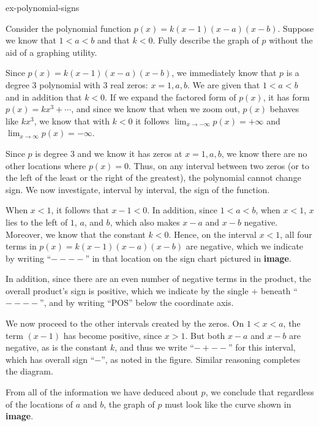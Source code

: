 \documentclass{ximera}
\begin{document}
\begin{example}{}{ex-polynomial-signs}%

Consider the polynomial function $p(x) = k(x-1)(x-a)(x-b)$.  Suppose we know that $1 < a < b$ and that $k < 0$.  Fully describe the graph of $p$ without the aid of a graphing utility.%

Since $p(x) = k(x-1)(x-a)(x-b)$, we immediately know that $p$ is a degree $3$ polynomial with $3$ real zeros:  $x = 1, a, b$.  We are given that $1 < a < b$ and in addition that $k < 0$.  If we expand the factored form of $p(x)$, it has form $p(x) = kx^3 + \cdots$, and since we know that when we zoom out, $p(x)$ behaves like $kx^3$, we know that with $k < 0$ it follows $\lim_{x \to -\infty} p(x) = +\infty$ and $\lim_{x \to \infty} p(x) = -\infty$.%

Since $p$ is degree $3$ and we know it has zeros at $x = 1, a, b$, we know there are no other locations where $p(x) = 0$.  Thus, on any interval between two zeros (or to the left of the least or the right of the greatest), the polynomial cannot change sign.  We now investigate, interval by interval, the sign of the function.%


When $x < 1$, it follows that $x - 1 < 0$.  In addition, since $1 < a < b$, when $x < 1$, $x$ lies to the left of $1$, $a$, and $b$, which also makes $x-a$ and $x-b$ negative.  Moreover, we know that the constant $k < 0$.  Hence, on the interval $x < 1$, all four terms in $p(x) = k(x-1)(x-a)(x-b)$ are negative, which we indicate by writing ``$----$'' in that location on the sign chart pictured in \textbf{image}.%

In addition, since there are an even number of negative terms in the product, the overall product's sign is positive, which we indicate by the single $+$ beneath ``$----$'', and by writing ``POS'' below the coordinate axis.%

We now proceed to the other intervals created by the zeros.  On $1 < x < a$, the term $(x-1)$ has become positive, since $x > 1$.  But both $x-a$ and $x-b$ are negative, as is the constant $k$, and thus we write ``$-+--$'' for this interval, which has overall sign ``$-$'', as noted in the figure.  Similar reasoning completes the diagram.%

From all of the information we have deduced about $p$, we conclude that regardless of the locations of $a$ and $b$, the graph of $p$ must look like the curve shown in \textbf{image}.%

\end{example}
\end{document}
